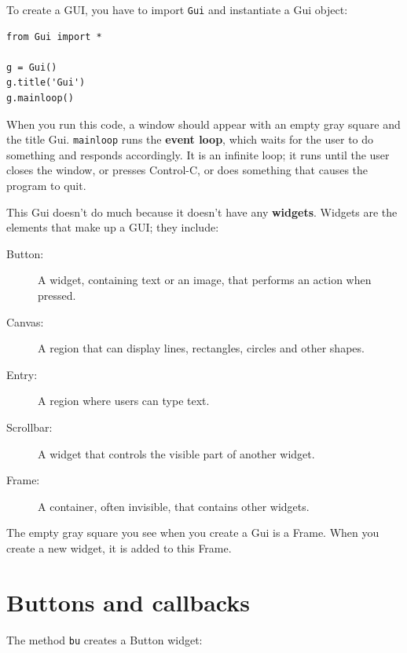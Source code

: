\documentclass[10pt]{book}
\begin{document}
To create a GUI, you have to import {\tt Gui} and instantiate
a Gui object:

\beforeverb
\begin{verbatim}
from Gui import *

g = Gui()
g.title('Gui')
g.mainloop()
\end{verbatim}
\afterverb
%
When you run this code, a window should appear with an empty gray
square and the title {\sf Gui}.  {\tt mainloop} runs the {\bf event
  loop}, which waits for the user to do something and responds
accordingly.  It is an infinite loop; it runs until the user closes
the window, or presses Control-C, or does something that causes the
program to quit.


This Gui doesn't do much because it doesn't have any
{\bf widgets}.  Widgets are the elements that make up a
GUI; they include:


\begin{description}

\item[Button:] A widget, containing text or an image, that
performs an action when pressed.

\item[Canvas:] A region that can display lines, rectangles,
circles and other shapes.

\item[Entry:] A region where users can type text.

\item[Scrollbar:] A widget that controls the visible part of another
widget.

\item[Frame:] A container, often invisible, that contains other
widgets.

\end{description}

The empty gray square you see when you create a Gui is
a Frame.  When you create a new widget, it is added to this Frame.



\section{Buttons and callbacks}


The method {\tt bu} creates a Button widget:
\end{document}

